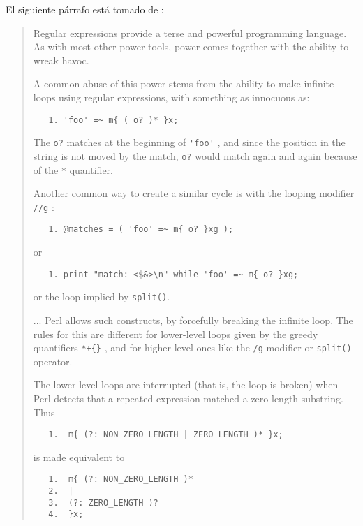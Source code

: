 El siguiente párrafo está tomado de :
\begin{it}
\begin{quote}
Regular expressions provide a terse and powerful programming language. As
with most other power tools, power comes together with the ability to
wreak havoc.

A common abuse of this power stems from the ability to make infinite
loops using regular expressions, with something as innocuous as:

\begin{verbatim}
   1. 'foo' =~ m{ ( o? )* }x;
\end{verbatim}

The \verb|o?| matches at the beginning of \verb|'foo'| , and since the position in
the string is not moved by the match, \verb|o?| would match again and again
because of the \verb|*| quantifier.

 Another common way to create a similar cycle is with the looping modifier \verb|//g| :

\begin{verbatim}
   1. @matches = ( 'foo' =~ m{ o? }xg );
\end{verbatim}

or

\begin{verbatim}
   1. print "match: <$&>\n" while 'foo' =~ m{ o? }xg;
\end{verbatim}

or the loop implied by \verb|split()|.

... Perl allows such constructs, by forcefully breaking the infinite
loop. The rules for this are different for lower-level loops given by
the greedy quantifiers \verb|*+{}| , and for higher-level ones like the \verb|/g|
modifier or \verb|split()| operator.

The lower-level loops are interrupted (that is, the loop is broken)
when Perl detects that a repeated expression matched a zero-length
substring. Thus

\begin{verbatim}
   1.  m{ (?: NON_ZERO_LENGTH | ZERO_LENGTH )* }x;
\end{verbatim}

is made equivalent to

\begin{verbatim}
   1.  m{ (?: NON_ZERO_LENGTH )*
   2.  |
   3.  (?: ZERO_LENGTH )?
   4.  }x;
\end{verbatim}


\end{quote}
\end{it}
